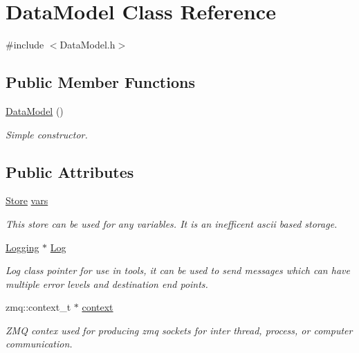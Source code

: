 \hypertarget{classDataModel}{\section{Data\-Model Class Reference}
\label{classDataModel}
}


{\ttfamily \#include $<$Data\-Model.\-h$>$}

\subsection*{Public Member Functions}
\begin{DoxyCompactItemize}
\item 
\hypertarget{classDataModel_abff03aef2cb531142a35781bb87c3365}{\hyperlink{classDataModel_abff03aef2cb531142a35781bb87c3365}{Data\-Model} ()}\label{classDataModel_abff03aef2cb531142a35781bb87c3365}

\begin{DoxyCompactList}\small\item\em Simple constructor. \end{DoxyCompactList}\end{DoxyCompactItemize}
\subsection*{Public Attributes}
\begin{DoxyCompactItemize}
\item 
\hypertarget{classDataModel_a4baac5fe364a7a23762d70d2c2216486}{\hyperlink{classStore}{Store} \hyperlink{classDataModel_a4baac5fe364a7a23762d70d2c2216486}{vars}}\label{classDataModel_a4baac5fe364a7a23762d70d2c2216486}

\begin{DoxyCompactList}\small\item\em This store can be used for any variables. It is an inefficent ascii based storage. \end{DoxyCompactList}\item 
\hypertarget{classDataModel_aa777da4c632e4659ee5b1447ad513458}{\hyperlink{classLogging}{Logging} $\ast$ \hyperlink{classDataModel_aa777da4c632e4659ee5b1447ad513458}{Log}}\label{classDataModel_aa777da4c632e4659ee5b1447ad513458}

\begin{DoxyCompactList}\small\item\em Log class pointer for use in tools, it can be used to send messages which can have multiple error levels and destination end points. \end{DoxyCompactList}\item 
\hypertarget{classDataModel_a2c6dfd692e50f90e55338970ea7f8d61}{zmq\-::context\-\_\-t $\ast$ \hyperlink{classDataModel_a2c6dfd692e50f90e55338970ea7f8d61}{context}}\label{classDataModel_a2c6dfd692e50f90e55338970ea7f8d61}

\begin{DoxyCompactList}\small\item\em Z\-M\-Q contex used for producing zmq sockets for inter thread, process, or computer communication. \end{DoxyCompactList}\end{DoxyCompactItemize}


